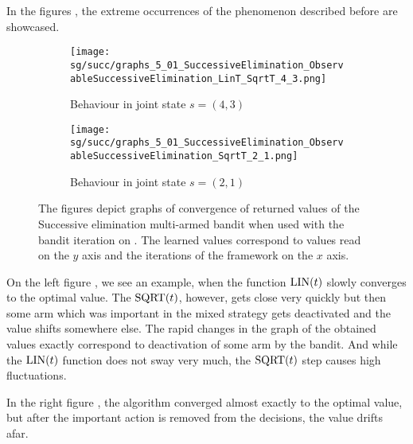 \documentclass[../main.tex]{subfiles}
\begin{document}
In the figures , the extreme occurrences of the phenomenon described before are showcased.
\begin{figure}[ht]
    \begin{subfigure}[t]{0.45\linewidth}
        \texttt{[image: sg/succ/graphs\_5\_01\_SuccessiveElimination\_ObservableSuccessiveElimination\_LinT\_SqrtT\_4\_3.png]}
        \caption{Behaviour in joint state $s = \left(4, 3\right)$}
        \label{apx:sgexp:succ:fig:graph5:43}
    \end{subfigure}
    \hfill
    \begin{subfigure}[t]{0.45\linewidth}
        \texttt{[image: sg/succ/graphs\_5\_01\_SuccessiveElimination\_ObservableSuccessiveElimination\_SqrtT\_2\_1.png]}
        \caption{Behaviour in joint state $s = \left(2, 1\right)$}
        \label{apx:sgexp:succ:fig:graph5:21}
    \end{subfigure}
    \caption[Comparison of observable and standard Successive elimination bandit]{
        The figures depict graphs of convergence of returned values of the Successive elimination multi-armed bandit when used with the bandit iteration on .
        The learned values correspond to values read on the $y$ axis and the iterations of the framework on the $x$ axis.
    }
    \label{apx:sgexp:succ:fig}
\end{figure}
On the left figure , we see an example, when the function $\text{LIN}(t)$ slowly converges to the optimal value.
The $\text{SQRT}(t)$, however, gets close very quickly but then some arm which was important in the mixed strategy gets deactivated and the value shifts somewhere else.
The rapid changes in the graph of the obtained values exactly correspond to deactivation of some arm by the bandit.
And while the $\text{LIN}(t)$ function does not sway very much, the $\text{SQRT}(t)$ step causes high fluctuations.

In the right figure , the algorithm converged almost exactly to the optimal value, but after the important action is removed from the decisions, the value drifts afar.
\end{document}
